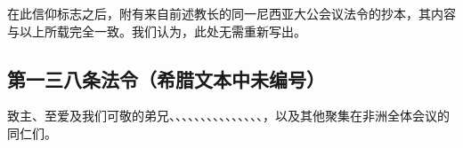在此信仰标志之后，附有来自前述教长的同一尼西亚大公会议法令的抄本，其内容与以上所载完全一致。我们认为，此处无需重新写出。\par


\subsection{第一三八条法令（希腊文本中未编号）}

\par

致主、至爱及我们可敬的弟兄、、、、、、、、、、、、、、、，以及其他聚集在非洲全体会议的同仁们。\par

